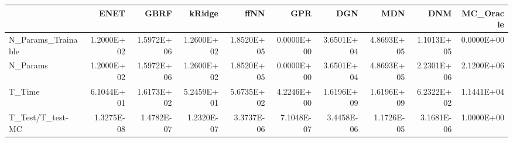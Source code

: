 \begin{tabular}{lrrrrrrrrr}
\toprule
{} &       ENET &       GBRF &     kRidge &       ffNN &        GPR &        DGN &        MDN &        DNM &  MC\_Oracle \\
\midrule
N\_Params\_Trainable & 1.2000E+02 & 1.5972E+06 & 1.2600E+02 & 1.8520E+05 & 0.0000E+00 & 3.6501E+04 & 4.8693E+05 & 1.1013E+05 & 0.0000E+00 \\
N\_Params           & 1.2000E+02 & 1.5972E+06 & 1.2600E+02 & 1.8520E+05 & 0.0000E+00 & 3.6501E+04 & 4.8693E+05 & 2.2301E+06 & 2.1200E+06 \\
T\_Time             & 6.1044E+01 & 1.6173E+02 & 5.2459E+01 & 5.6735E+02 & 4.2246E+00 & 1.6196E+09 & 1.6196E+09 & 6.2322E+02 & 1.1441E+04 \\
T\_Test/T\_test-MC   & 1.3275E-08 & 1.4782E-07 & 1.2320E-07 & 3.3737E-06 & 7.1048E-07 & 3.4458E-06 & 1.1726E-05 & 3.1681E-06 & 1.0000E+00 \\
\bottomrule
\end{tabular}
